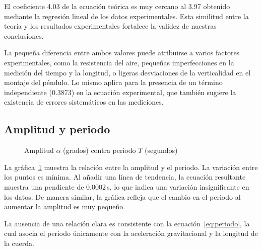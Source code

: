 \documentclass[letterpaper]{report}
\numberwithin{table}{section}
\begin{document}
El coeficiente 4.03 de la ecuación teórica es muy cercano al 3.97 obtenido
mediante la regresión lineal de los datos experimentales. Esta similitud
entre la teoría y los resultados experimentales fortalece la validez de
nuestras conclusiones.

La pequeña diferencia entre ambos valores puede atribuirse a varios factores
experimentales, como la resistencia del aire, pequeñas imperfecciones en la
medición del tiempo y la longitud, o ligeras desviaciones de la verticalidad en
el montaje del péndulo. Lo mismo aplica para la presencia de un término
independiente (0.3873) en la ecuación experimental, que también sugiere la
existencia de errores sistemáticos en las mediciones.

\subsection{Amplitud y periodo}

\begin{figure}[ht]
  \centering
  \caption{Amplitud $\alpha$ (grados) contra periodo $T$
  (segundos)}\label{fig:amplitud_periodo}
\end{figure}

La gráfica~\ref{fig:amplitud_periodo} muestra la relación entre la
amplitud y el periodo. La variación entre los puntos es mínima. Al
añadir una línea de tendencia, la ecuación resultante muestra una
pendiente de $0.0002$\,s, lo que indica una variación insignificante
en los datos. De manera similar, la gráfica refleja que el cambio en
el periodo al aumentar la amplitud es muy pequeño.

La ausencia de una relación clara es consistente con la
ecuación~\eqref{eq:periodo}, la cual asocia el periodo únicamente con la
aceleración gravitacional y la longitud de la cuerda.
\end{document}
